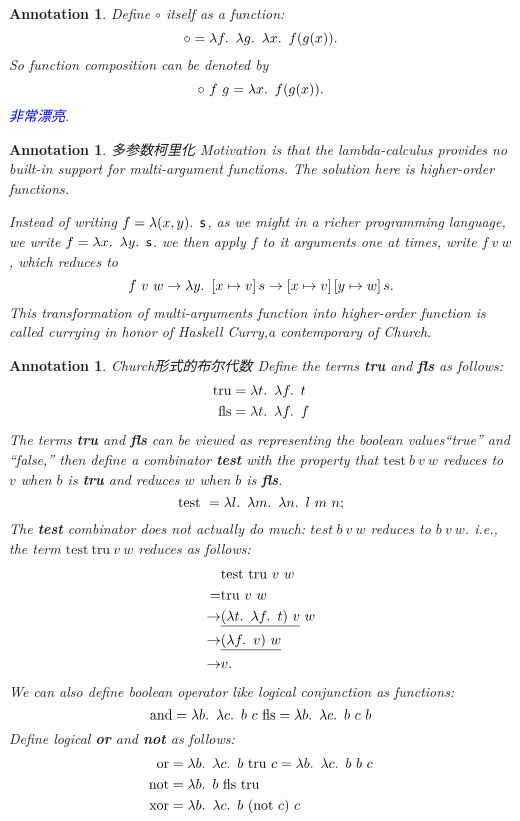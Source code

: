 \documentclass{article}
\theoremstyle{plain}
\newtheorem{annotation}[theorem]{Annotation}
\theoremstyle{nonumberplain}
\newcommand{\lam}[2]{\ensuremath{\lambda #1\ldotp~ #2}} %
\newcommand{\term}[1]{\ensuremath\mathsf{#1}}
\newcommand{\bluet}[1]{\textcolor{blue}{#1}}
\begin{document}
\begin{annotation}
\rm Define $\circ$ itself as a function:
$$
\circ = \lam{f}{\lam{g}{\lam{x}{f(g(x))}}}. 
$$
So function composition can be denoted by
$$
\circ~f~g  = \lam{x}{f(g(x))}.
$$
\bluet{非常漂亮}. 
\end{annotation}

\begin{annotation}
\rm {\color{red} 多参数柯里化} Motivation is that the lambda-calculus provides no built-in support for multi-argument functions. The solution here is higher-order functions. 

Instead of writing $f = \lam{(x,y)}{\term{s}}$, as we might in a richer programming language, we write $f = \lam{x}{\lam{y}{\term{s}}}$. we then apply $f$ to it arguments one at times, write $f~v~w$, which reduces to
$$
f~v~w \rightarrow \lam{y}{\left[ x \mapsto v \right] s} \rightarrow \left[ x \mapsto v \right]\left[ y \mapsto w \right]s.
$$
This transformation of multi-arguments function into higher-order function is called {\color{red} currying} in honor of Haskell Curry,a contemporary of Church.
\end{annotation}

\begin{annotation}
\rm {\color{red} Church形式的布尔代数} Define the terms \textbf{tru} and \textbf{fls} as follows:
$$
\begin{aligned}
\text{tru} &= \lam{t}{\lam{f}{t}}\\
\text{fls} &= \lam{t}{\lam{f}{f}}\\
\end{aligned}
$$
The terms \textbf{tru} and \textbf{fls} can be viewed as representing the boolean values“true” and “false,” then define a combinator \textbf{test} with the property that $\text{test}~b~v~w$ reduces to $v$ when $b$ is \textbf{tru} and reduces $w$ when $b$ is \textbf{fls}.
$$
\text{test}~= \lam{l}{\lam{m}{\lam{n}{l~m~n}}};
$$  
The \textbf{test} combinator does not actually do much: $test~b~v~w$ reduces to $b~v~w$. i.e., the term $\text{test}~\text{tru}~v~w$ reduces as follows:
$$
\begin{aligned}
&\text{test}~\text{tru}~v~w \\
= & \text{tru}~v~w \\
\rightarrow & \underline{(\lam{t}{\lam{f}{t}})~v}~w \\
\rightarrow & \underline{(\lam{f}{v})~w} \\
\rightarrow & v.
\end{aligned}
$$
We can also define boolean operator like logical conjunction as functions:
$$
\text{and} = \lam{b}{\lam{c}{b~c~\text{fls}}} = \lam{b}{\lam{c}{b~c~b}} 
$$
Define logical \textbf{or} and \textbf{not} as follows:
$$
\begin{aligned}
\text{or} &= \lam{b}{\lam{c}{b~\text{tru}~c}} = \lam{b}{\lam{c}{b~b~c}} \\
\text{not} &= \lam{b}{b~\text{fls}~\text{tru}} \\
\text{xor} &= \lam{b}{\lam{c}{b~(\text{not}~c)~c}}
\end{aligned}
$$ 
\end{annotation}
\end{document}
